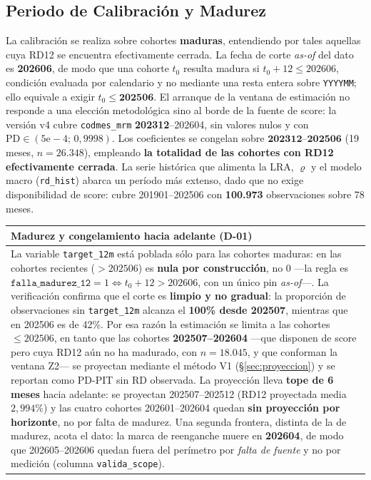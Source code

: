 \documentclass[12pt, a4paper]{article}
\newcommand{\PD}{\ensuremath{\mathrm{PD}}}
\renewcommand{\rho}{\ensuremath{\varrho}}
\newenvironment{recuadro}[1]
{\begin{center}\begin{tabular}{|p{0.92\textwidth}|}
\hline
\rowcolor{grissuave}
\textbf{#1} \\ \hline
}
{\\ \hline \end{tabular}\end{center}}
\begin{document}
\subsection{Periodo de Calibración y Madurez}
La calibración se realiza sobre cohortes \textbf{maduras}, entendiendo por tales aquellas cuya
RD12 se encuentra efectivamente cerrada. La fecha de corte \emph{as-of} del dato es
\textbf{202606}, de modo que una cohorte $t_0$ resulta madura si $t_0+12\le 202606$, condición
evaluada por calendario y no mediante una resta entera sobre \texttt{YYYYMM}; ello equivale a
exigir $t_0\le \mathbf{202506}$. El arranque de la ventana de estimación no responde a una
elección metodológica sino al borde de la fuente de score: la versión v4 cubre
\texttt{codmes\_mrm} \textbf{202312}--202604, sin valores nulos y con
$\PD\in(5\mathrm{e}{-}4;\,0{,}9998)$. Los coeficientes se congelan sobre
$\mathbf{202312}$--$\mathbf{202506}$ (19 meses, $n=26.348$), empleando \textbf{la totalidad de las
cohortes con RD12 efectivamente cerrada}. La serie histórica que alimenta la LRA, $\rho$ y el
modelo macro (\texttt{rd\_hist}) abarca un período más extenso, dado que no exige disponibilidad
de score: cubre 201901--202506 con \textbf{100.973} observaciones sobre 78 meses.

\begin{recuadro}{Madurez y congelamiento hacia adelante (D-01)}
La variable \texttt{target\_12m} está poblada sólo para las cohortes maduras: en las cohortes
recientes ($>202506$) es \textbf{nula por construcción}, no 0 ---la regla es
$\texttt{falla\_madurez\_12}=1 \Leftrightarrow t_0+12>202606$, con un único pin
\emph{as-of}---. La verificación confirma que el corte es \textbf{limpio y no gradual}: la
proporción de observaciones sin \texttt{target\_12m} alcanza el \textbf{100\% desde 202507},
mientras que en 202506 es de 42\%. Por esa razón la estimación se limita a las cohortes
$\le 202506$, en tanto que las cohortes \textbf{202507--202604} ---que disponen de score pero
cuya RD12 aún no ha madurado, con $n=18.045$, y que conforman la ventana Z2--- se proyectan
mediante el método V1 (\S\ref{sec:proyeccion}) y se reportan como PD-PIT sin RD observada. La proyección lleva \textbf{tope de 6 meses} hacia adelante: se proyectan
202507--202512 (RD12 proyectada media $2{,}994\%$) y las cuatro cohortes 202601--202604 quedan
\textbf{sin proyección por horizonte}, no por falta de madurez. Una segunda frontera, distinta
de la de madurez, acota el dato: la marca de reenganche muere en \textbf{202604}, de modo que
202605--202606 quedan fuera del perímetro por \emph{falta de fuente} y no por medición
(columna \texttt{valida\_scope}).
\end{recuadro}
\end{document}
